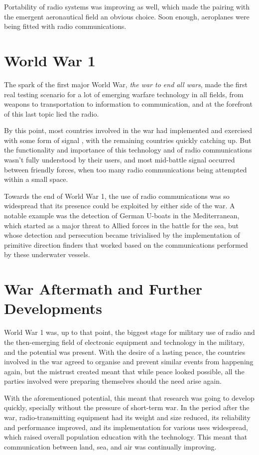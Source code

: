 \documentclass[palatino,english,purist]{ist-report}
\begin{document}
Portability of radio systems was improving as well, which made the pairing with the emergent aeronautical field an obvious choice. Soon enough, aeroplanes were being fitted with radio communications.

\section{World War 1}

The spark of the first major World War, \textit{the war to end all wars}, made the first real testing scenario for a lot of emerging warfare technology in all fields, from weapons to transportation to information to communication, and at the forefront of this last topic lied the radio.

By this point, most countries involved in the war had implemented and exercised with some form of signal \jamming{}, with the remaining countries quickly catching up. But the functionality and importance of this technology and of radio communications wasn't fully understood by their users, and most mid-battle signal \jamming{} occurred between friendly forces, when too many radio communications being attempted within a small space.

Towards the end of World War 1, the use of radio communications was so widespread that its presence could be exploited by either side of the war. A notable example was the detection of German U-boats in the Mediterranean, which started as a major threat to Allied forces in the battle for the sea, but whose detection and persecution became trivialised by the implementation of primitive direction finders that worked based on the communications performed by these underwater vessels.

\section{War Aftermath and Further Developments}\label{sec:betweenwars}

World War 1 was, up to that point, the biggest stage for military use of radio and the then-emerging field of electronic equipment and technology in the military, and the potential was present. With the desire of a lasting peace, the countries involved in the war agreed to organise and prevent similar events from happening again, but the mistrust created meant that while peace looked possible, all the parties involved were preparing themselves should the need arise again.

With the aforementioned potential, this meant that research was going to develop quickly, specially without the pressure of short-term war. In the period after the war, radio-transmitting equipment had its weight and size reduced, its reliability and performance improved, and its implementation for various uses widespread, which raised overall population education with the technology. This meant that communication between land, sea, and air was continually improving.
\end{document}
